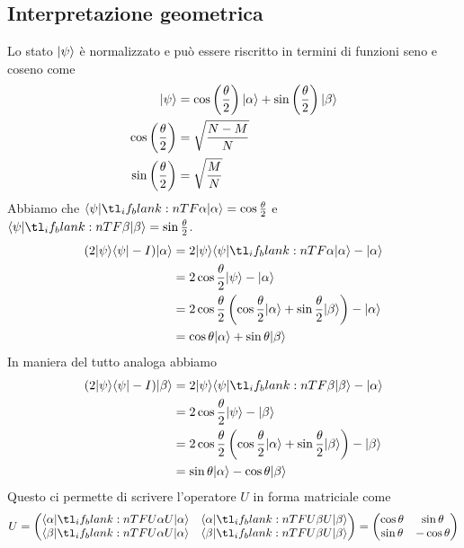 \documentclass[12pt, a4paper]{report}
\begin{document}
\subsection{Interpretazione geometrica}
Lo stato $| \psi \rangle$ è normalizzato e può essere riscritto in termini di funzioni seno e coseno come
\begin{equation*}
    \begin{split}
        | \psi \rangle &= \cos\left(\frac{\theta}{2}\right)| \alpha \rangle+\sin\left(\frac{\theta}{2}\right)| \beta \rangle \\
        \cos\left(\frac{\theta}{2}\right) &= \sqrt{\frac{N-M}{N}} \\
        \sin\left(\frac{\theta}{2}\right) &= \sqrt{\frac{M}{N}}
    \end{split}
\end{equation*}
Abbiamo che $\braket{\psi}{\alpha}=\cos\frac{\theta}{2}$ e $\braket{\psi}{\beta}=\sin\frac{\theta}{2}$.
\begin{equation*}
    \begin{split}
        (2\ket{\psi}\bra{\psi}-I)\ket{\alpha} &= 2\ket{\psi}\braket{\psi}{\alpha}-\ket{\alpha} \\
        &= 2\cos\frac{\theta}{2}\ket{\psi}-\ket{\alpha} \\
        &= 2\cos\frac{\theta}{2}\left(\cos\frac{\theta}{2}\ket{\alpha}+\sin\frac{\theta}{2}\ket{\beta}\right)-\ket{\alpha} \\
        &= \cos\theta\ket{\alpha}+\sin\theta\ket{\beta}
    \end{split}
\end{equation*}
In maniera del tutto analoga abbiamo
\begin{equation*}
    \begin{split}
        (2\ket{\psi}\bra{\psi}-I)\ket{\beta} &= 2\ket{\psi}\braket{\psi}{\beta}-\ket{\alpha} \\
        &= 2\cos\frac{\theta}{2}\ket{\psi}-\ket{\beta} \\
        &= 2\cos\frac{\theta}{2}\left(\cos\frac{\theta}{2}\ket{\alpha}+\sin\frac{\theta}{2}\ket{\beta}\right)-\ket{\beta} \\
        &= \sin\theta\ket{\alpha}-\cos\theta\ket{\beta}
    \end{split}
\end{equation*}
Questo ci permette di scrivere l'operatore $U$ in forma matriciale come
\begin{equation*}
    U=\begin{pmatrix}
        \braket{\alpha}[U]{\alpha} & \braket{\alpha}[U]{\beta} \\
        \braket{\beta}[U]{\alpha} & \braket{\beta}[U]{\beta}
    \end{pmatrix}
    =\begin{pmatrix}
        \cos\theta & \sin\theta \\
        \sin\theta & -\cos\theta
    \end{pmatrix}
\end{equation*}
\end{document}
